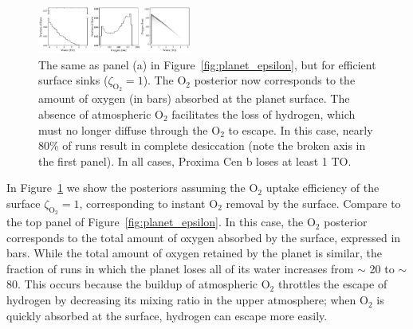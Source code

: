 \documentclass[]{emulateapj}
\begin{document}
\begin{figure}[hbt]
  \begin{center}
      \includegraphics[width=0.45\textwidth]{figures/planet_magma.pdf}
       \caption{The same as panel (a) in Figure~\ref{fig:planet_epsilon}, but for efficient surface sinks
       ($\zeta_\mathrm{O_2} = 1$). The O$_2$ posterior now corresponds to the amount of oxygen (in bars) absorbed
       at the planet surface. The absence of atmospheric O$_2$ facilitates the loss of hydrogen, which must
       no longer diffuse through the O$_2$ to escape. In this case, nearly 80\% of runs result in complete desiccation
       (note the broken axis in the first panel). In all cases, Proxima Cen b loses at least 1 TO.}
     \label{fig:planet_magma}
  \end{center}
\end{figure}

In Figure~\ref{fig:planet_magma} we show the posteriors assuming the O$_2$ uptake
efficiency of the surface $\zeta_\mathrm{O_2} = 1$, corresponding to instant O$_2$ removal by the surface. Compare
to the top panel of Figure~\ref{fig:planet_epsilon}. In this case, the O$_2$ posterior corresponds to the total amount
of oxygen absorbed by the surface, expressed in bars. While the total amount of oxygen retained by the planet
is similar, the fraction of runs in which the planet loses all of its water increases from $\sim$ 20 to $\sim$ 80.
This occurs because the buildup of atmospheric O$_2$ throttles the escape of hydrogen by decreasing its mixing
ratio in the upper atmosphere; when O$_2$ is quickly absorbed at the surface, hydrogen can escape more easily.
\end{document}
